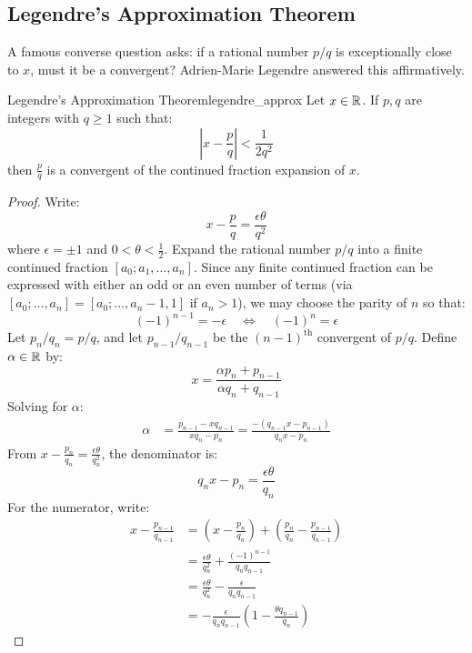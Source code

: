 \documentclass[a4paper]{article}
\begin{document}
\subsection{Legendre's Approximation Theorem}
A famous converse question asks: if a rational number $p/q$ is exceptionally close to $x$, must it be a convergent?
Adrien-Marie Legendre answered this affirmatively.

\begin{mytheorem}{Legendre's Approximation Theorem}{legendre_approx}
  Let $x \in \mathbb{R}$. If $p, q$ are integers with $q \ge 1$ such that:
  \[
    \left| x - \frac{p}{q} \right| < \frac{1}{2 q^2}
  \]
  then $\frac{p}{q}$ is a convergent of the continued fraction expansion of $x$.

  \begin{proof}
    Write:
    \[
      x - \frac{p}{q} = \frac{\epsilon \theta}{q^2}
    \]
    where $\epsilon = \pm 1$ and $0 < \theta < \frac{1}{2}$.
    Expand the rational number $p/q$ into a finite continued fraction $[a_0; a_1, \dots, a_n]$.
    Since any finite continued fraction can be expressed with either an odd or an even number of terms (via $[a_0; \dots, a_n] = [a_0; \dots, a_n - 1, 1]$ if $a_n > 1$), we may choose the parity of $n$ so that:
    \[
      (-1)^{n-1} = -\epsilon \quad \Longleftrightarrow \quad (-1)^n = \epsilon
    \]
    Let $p_n/q_n = p/q$, and let $p_{n-1}/q_{n-1}$ be the $(n-1)^{\text{th}}$ convergent of $p/q$.
    Define $\alpha \in \mathbb{R}$ by:
    \[
      x = \frac{\alpha p_n + p_{n-1}}{\alpha q_n + q_{n-1}}
    \]
    Solving for $\alpha$:
    \begin{align*}
      \alpha & = \frac{p_{n-1} - x q_{n-1}}{x q_n - p_n} = \frac{-(q_{n-1} x - p_{n-1})}{q_n x - p_n}
    \end{align*}
    From $x - \frac{p_n}{q_n} = \frac{\epsilon \theta}{q_n^2}$, the denominator is:
    \[
      q_n x - p_n = \frac{\epsilon \theta}{q_n}
    \]
    For the numerator, write:
    \begin{align*}
      x - \frac{p_{n-1}}{q_{n-1}} & = \left( x - \frac{p_n}{q_n} \right) + \left( \frac{p_n}{q_n} - \frac{p_{n-1}}{q_{n-1}} \right) \\
      & = \frac{\epsilon \theta}{q_n^2} + \frac{(-1)^{n-1}}{q_n q_{n-1}} \\
      & = \frac{\epsilon \theta}{q_n^2} - \frac{\epsilon}{q_n q_{n-1}} \\
      & = -\frac{\epsilon}{q_n q_{n-1}} \left( 1 - \frac{\theta q_{n-1}}{q_n} \right)
    \end{align*}

\end{proof}
\end{mytheorem}
\end{document}
